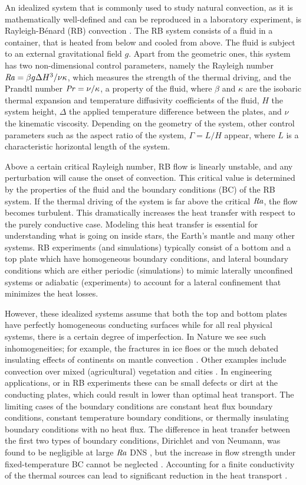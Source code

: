 \documentclass{jfm}
\newcommand\Pran{\mbox{\textit{Pr}}} %
\newcommand\Ray{\mbox{\textit{Ra}}}  %
\begin{document}
An idealized system that is commonly used to study natural convection, as it
is mathematically well-defined and can be reproduced in a laboratory
experiment, is  Rayleigh-B\'enard (RB) convection \citep{nor77, ahl09, loh10,
chi12}.  The RB system consists of a fluid in a container, that is heated from
below and cooled from above.  The fluid is subject to an external
gravitational field $g$.  Apart from the geometric ones, this system has two
non-dimensional control parameters, namely the Rayleigh number $\Ray = \beta g
\Delta H^3 / \nu \kappa$, which measures the strength of the thermal driving,
and the Prandtl number $\Pran = \nu / \kappa$, a property of the fluid, where
$\beta$ and $\kappa$ are the isobaric thermal expansion and temperature
diffusivity coefficients of the fluid, $H$ the system height, $\Delta$ the
applied temperature difference between the plates, and $\nu$ the kinematic
viscosity.  Depending on the geometry of the system, other control parameters
such as the aspect ratio of the system, $\Gamma = L / H$ appear, where $L$ is
a characteristic horizontal length of the system.

Above a certain critical Rayleigh number, RB flow is linearly unstable, and
any perturbation will cause the onset of convection. This critical value is
determined by the properties of the fluid and the boundary conditions (BC) of
the RB system. If the thermal driving of the system is far
above the critical $\Ray$, the flow becomes turbulent. This dramatically
increases the heat transfer with respect to the purely conductive case.
Modeling this heat transfer is essential for understanding what is going on
inside stars, the Earth's mantle and many other systems. RB experiments (and
simulations) typically consist of a bottom and a top plate which have
homogeneous boundary conditions, and lateral boundary conditions which are
either periodic (simulations) to mimic laterally unconfined systems or
adiabatic (experiments) to account for a lateral confinement that minimizes
the heat losses.

However, these idealized systems assume that both the top and bottom plates
have perfectly homogeneous conducting surfaces while for all real physical
systems, there is a certain degree of imperfection.  In Nature we see such
inhomogeneities; for example, the fractures in ice floes \citep{mar12} or the
much debated insulating effects of continents on mantle convection
\citep{len05}.  Other examples include convection over mixed (agricultural)
vegetation and cities \citep{zhao14}.  In engineering applications, or in RB
experiments these can be small defects or dirt at the conducting plates, which
could result in lower than optimal heat transport. The limiting
cases of the boundary conditions are constant heat flux boundary
conditions, constant temperature boundary conditions, or thermally
insulating boundary conditions with no heat flux.  The difference in heat
transfer between the first two types of boundary conditions, Dirichlet and
von Neumann, was found to be negligible at large $\Ray$ DNS \citep{joh07,
joh09, ste11}, but the increase in flow strength under fixed-temperature
BC cannot be neglected \citep{huang17}. Accounting for a finite conductivity
of the thermal sources can lead to significant reduction in the heat transport
\citep{ver04}.
\end{document}
